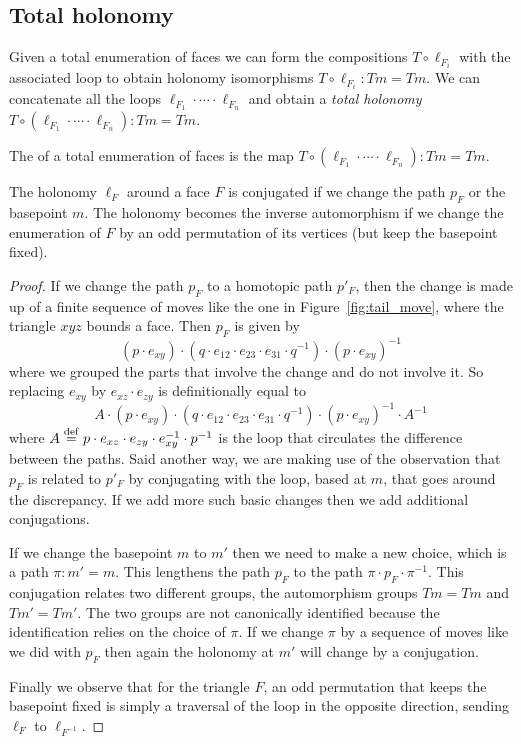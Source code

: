 \subsection{Total holonomy}
Given a total enumeration of faces we can form the compositions \( T\circ\ell_{F_i} \) with the associated loop to obtain holonomy isomorphisms \( T\circ\ell_{F_i}:Tm=Tm \). We can concatenate all the loops \( \ell_{F_1}\cdot\cdots\cdot\ell_{F_n} \) and obtain a \emph{total holonomy} \( T\circ(\ell_{F_1}\cdot\cdots\cdot\ell_{F_n}):Tm=Tm  \).

\begin{mydef}
The  of a total enumeration of faces is the map \( T\circ(\ell_{F_1}\cdot\cdots\cdot\ell_{F_n}):Tm=Tm  \).
\end{mydef}

\begin{myprop}
The holonomy \( \ell_F \) around a face \( F \) is conjugated if we change the path \( p_F \) or the basepoint \( m \). The holonomy becomes the inverse automorphism if we change the enumeration of \( F \) by an odd permutation of its vertices (but keep the basepoint fixed).
\end{myprop}
\begin{proof}
If we change the path \( p_F \) to a homotopic path \( p'_F \), then the change is made up of a finite sequence of moves like the one in Figure~\ref{fig:tail_move}, where the triangle \( xyz \) bounds a face. Then \( p_{F} \) is given by 
\[ (p\cdot e_{xy})\cdot (q\cdot e_{12}\cdot e_{23}\cdot e_{31}\cdot q^{-1})\cdot (p\cdot e_{xy})^{-1}\] 
where we grouped the parts that involve the change and do not involve it. So replacing \( e_{xy} \) by \( e_{xz}\cdot e_{zy} \) is definitionally equal to 
\[ A\cdot (p\cdot e_{xy})\cdot (q\cdot e_{12}\cdot e_{23}\cdot e_{31}\cdot q^{-1})\cdot (p\cdot e_{xy})^{-1}\cdot A^{-1}\] 
where \( A\stackrel{\mathrm{def}}{=} p\cdot e_{xz}\cdot e_{zy}\cdot e_{xy}^{-1}\cdot p^{-1} \) is the loop that circulates the difference between the paths. Said another way, we are making use of the observation that \( p_F \) is related to \( p'_F \) by conjugating with the loop, based at \( m \), that goes around the discrepancy. If we add more such basic changes then we add additional conjugations.

If we change the basepoint \( m \) to \( m' \) then we need to make a new choice, which is a path \( \pi:m'=m \). This lengthens the path \( p_F \) to the path \( \pi\cdot p_F\cdot \pi^{-1} \). This conjugation relates two different groups, the automorphism groups \( Tm=Tm \) and \( Tm'=Tm' \). The two groups are not canonically identified because the identification relies on the choice of \( \pi \). If we change \( \pi \) by a sequence of moves like we did with \( p_F \) then again the holonomy at \( m' \) will change by a conjugation.

Finally we observe that for the triangle \( F \), an odd permutation that keeps the basepoint fixed is simply a traversal of the loop in the opposite direction, sending \( \ell_F \) to \( \ell_{F^{-1}} \).
\end{proof}

